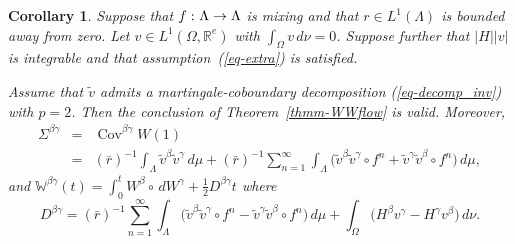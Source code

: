 \documentclass[aop,MSNbibl,seceqn,dvips]{arximspdf}
\newcommand{\eqref}[1]{(\ref{#1})}
\newtheorem{cor}[thmm]{Corollary}
\newcommand{\R}{\mathbb{R}}
\newcommand{\BBW}{\mathbb{W}}
\newcommand{\Cov}{\operatorname{Cov}}
\newcommand{\tildev}{\tilde{v}}
\begin{document}
\begin{cor} \label{cor-WWflow}
Suppose that $f\dvtx\Lambda\to\Lambda$ is mixing and that $r\in
L^1(\Lambda
)$ is bounded away from zero.
Let $v\in L^1(\Omega,\R^e)$ with $\int_\Omega v \,d\nu=0$.
Suppose further that $|H||v|$ is integrable and that assumption~\eqref
{eq-extra} is satisfied.

Assume that $\tildev$ admits
a martingale-coboundary decomposition \eqref{eq-decomp_inv} with $p=2$.
Then the conclusion of Theorem~\ref{thmm-WWflow} is valid.
Moreover,
%
\begin{eqnarray*}
\Sigma^{\beta\gamma}&=&\Cov^{\beta\gamma}W(1)\\
&=&(\bar r)^{-1}\int
_\Lambda \tildev^\beta\tildev^\gamma \,d\mu+(
\bar r)^{-1}\sum_{n=1}^\infty \int
_\Lambda\bigl(\tildev^\beta\tildev^\gamma
\circ f^n+\tildev^\gamma \tildev ^\beta\circ
f^n\bigr) \,d\mu,
\end{eqnarray*}
%
and $\BBW^{\beta\gamma}(t)=\int_0^t W^\beta\circ \,dW^\gamma+\frac{1}2
D^{\beta\gamma}t$
where
%
\[
D^{\beta\gamma}=(\bar r)^{-1}\sum_{n=1}^\infty
\int_\Lambda \bigl(\tildev ^\beta\tildev^\gamma
\circ f^n-\tildev^\gamma\tildev^\beta\circ
f^n\bigr) \,d\mu+\int_\Omega\bigl(H^\beta
v^\gamma-H^\gamma v^\beta\bigr) \,d\nu.
\]
%
\end{cor}
\end{document}
